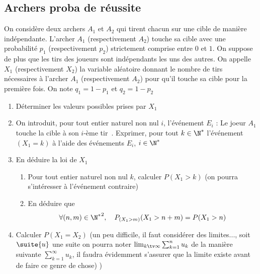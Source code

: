 \subsection{Archers proba de réussite}



\begin{exercice}
On considère deux archers $A_1$ et $A_2$ qui tirent chacun sur une cible de manière indépendante. 
L’archer $A_1$ (respectivement $A_2$) touche sa cible avec une probabilité $p_1$ (respectivement 
$p_2$) strictement comprise entre $0$ et $1$. On suppose de plus que les tirs des joueurs sont 
indépendants les uns des autres. On appelle $X_1$ (respectivement $X_2$) la variable aléatoire donnant 
le nombre de tirs nécessaires à l’archer $A_1$ (respectivement $A_2$) pour qu’il touche sa cible pour la 
première fois. On note $q_1=1-p_1$ et $q_2=1 -p_2$
\begin{enumerate}
\item Déterminer les valeurs possibles prises par $X_1$

\item On introduit, pour tout entier naturel non nul $i$, l'événement $E_i$ : \og Le joeur $A_1$ touche la cible à son $i$-ème tir\fg\, . 
Exprimer, pour tout $k\in \N^*$ l'événement $(X_1=k)$ à l'aide des événements $E_i$, $i\in \N^*$
\item En déduire la loi de $X_1$
\begin{enumerate}
\item Pour tout entier naturel non nul $k$, calculer $P(X_1>k)$ (on pourra s'intéresser à l'événement contraire) 
\item En déduire que 
$$\forall (n,m) \in {\N^*}^2, \quad P_{(X_1>m)} (X_1>n+m) = P(X_1>n)$$
\end{enumerate}
\item Calculer $P(X_1=X_2)$ (un peu difficile, il faut considérer des limites..., soit $\suite{u}$ une suite on pourra noter 
$\lim_{k\tv \infty} \sum_{k=1}^n u_k $ de la manière suivante $\sum_{k=1}^\infty u_k$, il faudra évidemment s'assurer que la limite existe avant de faire ce genre de chose) 
) 
\end{enumerate}
\end{exercice}



